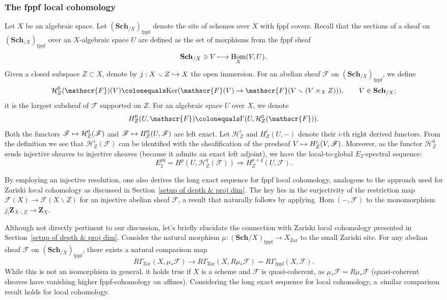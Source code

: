 \documentclass[JEP,XML,SOM,Unicode,published]{cedram}
\newcommand\mto{\mathchoice{\longmapsto}{\mapsto}{\mapsto}{\mapsto}}
\newcommand\hto{\mathrel{\lhook\joinrel\to}}
\let\backslash\smallsetminus
\newcommand{\GG}{\Gamma}
\newcommand{\cH}{\mathcal{H}}
\newcommand{\sF}{\mathscr{F}}
\let\ce\colonequals
\newcommand{\qq}{\quad\quad}
\newcommand{\fppf}{\mathrm{fppf}}
\DeclareMathOperator{\Hom}{Hom}
\theoremstyle{plain}
\theoremstyle{definition}
\begin{document}
\subsubsection{The fppf local cohomology}\label{par-The fppf local cohomology}
Let $X$ be an algebraic space. Let $(\mathbf{Sch}_{/X})_{\fppf}$ denote the site of schemes over $X$ with fppf covers. {Recall that the sections of a sheaf on $(\mathbf{Sch}_{/X})_{\fppf}$ over an $X$-algebraic space $U$ are defined as the set of morphisms from the fppf sheaf
\[
\mathbf{Sch}_{/X} \ni V \mto \Hom_{X}(V, U).
\]}
Given a closed subspace $Z\subset X$, denote by $j: X\backslash Z \hto X$ the open immersion. For an abelian sheaf $\sF$ on $(\mathbf{Sch}_{/X})_{\fppf}$, we define
\[
\cH_Z^0(\sF)(V)\ce \text{Ker}(\sF(V)\to \sF(V\backslash (V\times_XZ))) ,\qq V\in \mathbf{Sch}_{/X};
\]
it is the largest subsheaf of $\sF$ supported on $Z$.
For an algebraic space $U$ over $X$, we denote
\[
H_Z^0(U,\sF)\ce \GG(U, \cH_Z^0(\sF)).
\]
Both the functors $\sF\mto \cH_Z^0(\sF)$ and $\sF \mto H_Z^0(U,\sF)$ are left exact. Let $\cH_Z^i$ and $H_Z^i(U,-)$ denote their $i$-th right derived functors. From the definition we see that $\cH_Z^i(\sF)$ can be identified with the sheafification of the presheaf $V\mto H^i_Z(V,\sF)$. Moreover, as the functor $\cH_Z^0$ sends injective sheaves to injective sheaves (because it admits an exact left adjoint), we have the local-to-global $E_2$-spectral sequence:
\[
E_2^{pq}=H^p(U,\cH^q_Z(\sF))\Rightarrow H^{p+q}_Z(U,\sF).
\]
{By employing an injective resolution, one also derives the long exact sequence for fppf local cohomology, analogous to the approach used for Zariski local cohomology as discussed in Section~\ref{setup of depth & proj dim}. The key lies in the surjectivity of the restriction map $\sF(X)\to \sF(X\backslash Z)$ for an injective abelian sheaf $\sF$, a result that naturally follows by applying $\Hom(-,\sF)$ to the monomorphism $j_!\mathbf{Z}_{X\backslash Z}\to \mathbf{Z}_X$.

Although not directly pertinent to our discussion, let's briefly elucidate the connection with Zariski local cohomology presented in Section~\ref{setup of depth & proj dim}. Consider the natural morphism $\mu: (\mathbf{Sch}{/X})_{\fppf} \to X_{\mathrm{Zar}}$ to the small Zariski site. For any abelian sheaf $\sF$ on $(\mathbf{Sch}_{/X})_{\fppf}$, there exists a natural comparison map
\[
R\Gamma_{\mathrm{Zar}}(X,\mu_*\sF)\to R\Gamma_{\mathrm{Zar}}(X,R\mu_*\sF)=R\Gamma_{\fppf}(X,\sF).
\]
While this is not an isomorphism in general, it holds true if $X$ is a scheme and $\sF$ is quasi-coherent, as $\mu_*\sF=R\mu_*\sF$ (quasi-coherent sheaves have vanishing higher fppf-cohomology on affines). Considering the long exact sequence for local cohomology, a~similar comparison result holds for local cohomology.}
\end{document}
